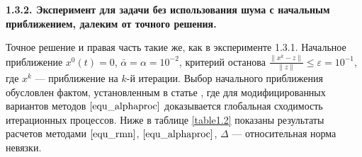 {\bfseries 1.3.2. Эксперимент для задачи без использования шума с начальным приближением, далеким от точного решения.} 

Точное решение и правая часть такие же, как в эксперименте 1.3.1.  Начальное приближение $x^0(t)=0$, $\bar\alpha=\alpha=10^{-2}$, критерий останова $\frac{\|x^k-z\|}{\|z\|}\le\varepsilon=10^{-1}$, где $x^k$ --- приближение на $k$-й итерации. Выбор начального приближения обусловлен фактом, установленным в статье \cite{Vasin2016}, где для модифицированных вариантов методов $\eqref{equ_alphaproc}$ доказывается глобальная сходимость итерационных процессов.%
Ниже в таблице \ref{table1.2} показаны результаты расчетов методами $\eqref{equ_rmn}$, $\eqref{equ_alphaproc}$, $\Delta$ --- относительная норма невязки. 

